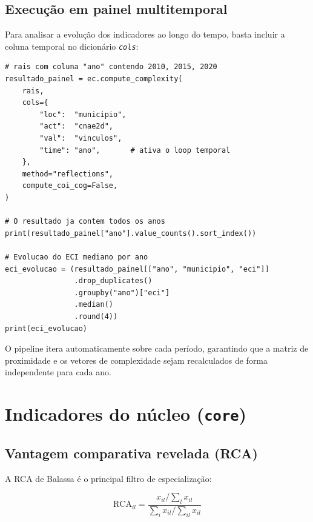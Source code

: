 \documentclass[12pt, a4paper]{article}
\newcommand{\argm}[1]{\textit{\texttt{#1}}}
\begin{document}
\subsection{Execu\c{c}\~{a}o em painel multitemporal}

Para analisar a evolu\c{c}\~{a}o dos indicadores ao longo do tempo,
basta incluir a coluna temporal no dicion\'{a}rio \argm{cols}:

\begin{lstlisting}[caption={Execu\c{c}\~{a}o em painel --- m\'{u}ltiplos anos}]
# rais com coluna "ano" contendo 2010, 2015, 2020
resultado_painel = ec.compute_complexity(
    rais,
    cols={
        "loc":  "municipio",
        "act":  "cnae2d",
        "val":  "vinculos",
        "time": "ano",       # ativa o loop temporal
    },
    method="reflections",
    compute_coi_cog=False,
)

# O resultado ja contem todos os anos
print(resultado_painel["ano"].value_counts().sort_index())

# Evolucao do ECI mediano por ano
eci_evolucao = (resultado_painel[["ano", "municipio", "eci"]]
                .drop_duplicates()
                .groupby("ano")["eci"]
                .median()
                .round(4))
print(eci_evolucao)
\end{lstlisting}

\begin{notebox}
  O pipeline itera automaticamente sobre cada per\'{i}odo, garantindo que
  a matriz de proximidade e os vetores de complexidade sejam recalculados
  de forma independente para cada ano.
\end{notebox}



\section{Indicadores do n\'{u}cleo (\texttt{core})}

\subsection{Vantagem comparativa revelada (RCA)}

A RCA de Balassa \'{e} o principal filtro de especializa\c{c}\~{a}o:

\[
  \text{RCA}_{il} = \frac{x_{il} / \sum_l x_{il}}
                         {\sum_i x_{il} / \sum_{il} x_{il}}
\]
\end{document}

